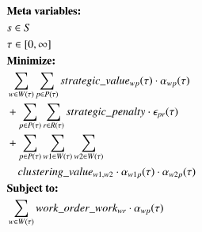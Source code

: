 \begin{alignat}{2}
	& \textbf{Meta variables:} \notag\\
	& \ElementScheduler \in \SetScheduler \notag\\
	& \tau \in [0, \infty] \notag\\
	& \textbf{Minimize:} \notag                                                                                                                                                                                                                                                                                \\
	& \sum_{\ElementWorkOrder \in \SetWorkOrder{}} \sum_{\ElementPeriod \in \SetPeriod} \ParStrategicValue \cdot \VarStrategicWorkOrderAssignment{\ElementWorkOrder}{\ElementPeriod}                                                                                                                           \\ 
	& + \sum_{\ElementPeriod \in \SetPeriod} \sum_{\ElementResource \in \SetResource} \ParStrategicPenalty \cdot \VarStrategicExcess                                                                                                                                                                           \\
	& + \sum_{\ElementPeriod \in \SetPeriod} \sum_{\ElementWorkOrder1 \in \SetWorkOrder{}} \sum_{\ElementWorkOrder2 \in \SetWorkOrder{}} \notag                                                                                                                                                                \\ 
	& \quad \ParClusteringValue \cdot \VarStrategicWorkOrderAssignment{\ElementWorkOrder1}{\ElementPeriod} \cdot \VarStrategicWorkOrderAssignment{\ElementWorkOrder2}{\ElementPeriod}                                                                                 \label{eqn:objective_function_strategic} \\
	& \textbf{Subject to:} \notag                                                                                                                                                                                                                                                                              \\
	& \sum_{\ElementWorkOrder \in \SetWorkOrder{}} \ParStrategicWorkOrderWeight \cdot \VarStrategicWorkOrderAssignment{\ElementWorkOrder}{\ElementPeriod} \notag                                                                                                                                               \\ 

\end{alignat}
